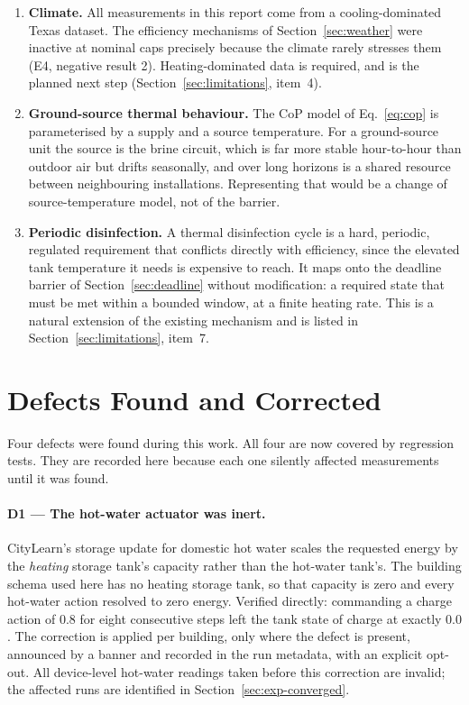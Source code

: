 \documentclass[11pt]{article}
\begin{document}
\begin{enumerate}[nosep]
\item \textbf{Climate.} All measurements in this report come from a
cooling-dominated Texas dataset. The efficiency mechanisms of
Section~\ref{sec:weather} were inactive at nominal caps precisely because the
climate rarely stresses them (E4, negative result 2). Heating-dominated data is
required, and is the planned next step
(Section~\ref{sec:limitations}, item~4).
\item \textbf{Ground-source thermal behaviour.} The CoP model of
Eq.~\ref{eq:cop} is parameterised by a supply and a source temperature. For a
ground-source unit the source is the brine circuit, which is far more stable
hour-to-hour than outdoor air but drifts seasonally, and over long horizons is a
shared resource between neighbouring installations. Representing that would be a
change of source-temperature model, not of the barrier.
\item \textbf{Periodic disinfection.} A thermal disinfection cycle is a hard,
periodic, regulated requirement that conflicts directly with efficiency, since
the elevated tank temperature it needs is expensive to reach. It maps onto the
deadline barrier of Section~\ref{sec:deadline} without modification: a required
state that must be met within a bounded window, at a finite heating rate. This is
a natural extension of the existing mechanism and is listed in
Section~\ref{sec:limitations}, item~7.
\end{enumerate}

\section{Defects Found and Corrected}
\label{sec:defects}

Four defects were found during this work. All four are now covered by regression
tests. They are recorded here because each one silently affected measurements
until it was found.

\paragraph{D1 --- The hot-water actuator was inert.} CityLearn's storage update
for domestic hot water scales the requested energy by the \emph{heating} storage
tank's capacity rather than the hot-water tank's. The building schema used here
has no heating storage tank, so that capacity is zero and every hot-water action
resolved to zero energy. Verified directly: commanding a charge action of $0.8$
for eight consecutive steps left the tank state of charge at exactly $0.0$. The
correction is applied per building, only where the defect is present, announced
by a banner and recorded in the run metadata, with an explicit opt-out. All
device-level hot-water readings taken before this correction are invalid; the
affected runs are identified in Section~\ref{sec:exp-converged}.
\end{document}
